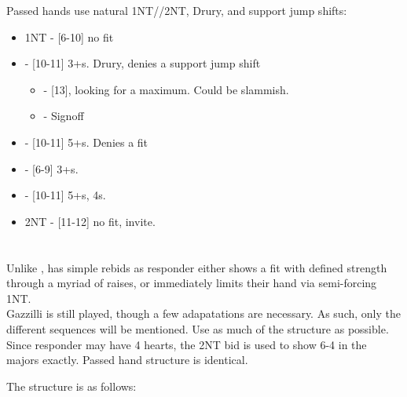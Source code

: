 \documentclass[12pt]{report}
\newcommand{\n}{\\}
\newcommand{\ul}[1]{\begin{itemize}#1\end{itemize}}
\newcommand{\li}{\item[~]}
\newcommand{\bidsection}[2]{\section{\texorpdfstring{#1}{#2}}}
\begin{document}
    Passed hands use natural 1NT//2NT,  Drury, and support jump shifts:
    \ul {
        \li 1NT - [6-10] no fit
        \li \cl2 - [10-11] 3+\he{}s.  Drury, denies a support jump shift
        \ul {
            \li \di2 - [13], looking for a maximum.  Could be slammish.
            \li \he2 - Signoff
        }
        \li \di2 - [10-11] 5+\di{}s.  Denies a fit
        \li \he2 - [6-9] 3+\he{}s.
        \li \sp2 - [10-11] 5+\sp{}s, 4\he{}s.
        \li 2NT - [11-12] no fit, invite.
    }

\bidsection{}{1♠} \label{2:5}

    Unlike ,  has simple rebids as responder either shows a fit with defined strength through a myriad of raises, or immediately limits their hand via semi-forcing 1NT.\n

    Gazzilli is still played, though a few adapatations are necessary.  As such, only the different sequences will be mentioned.  Use as much of the  structure as possible.\n

    Since responder may have 4 hearts, the 2NT bid is used to show 6-4 in the majors exactly.  Passed hand structure is identical.
    
    The structure is as follows:
\end{document}
